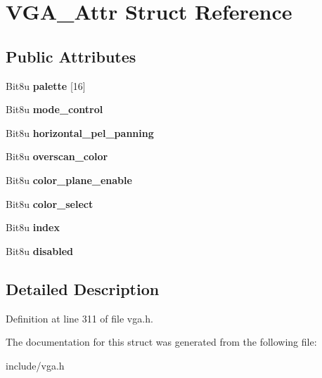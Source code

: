\hypertarget{structVGA__Attr}{\section{V\-G\-A\-\_\-\-Attr Struct Reference}
\label{structVGA__Attr}
}
\subsection*{Public Attributes}
\begin{DoxyCompactItemize}
\item 
\hypertarget{structVGA__Attr_ad99b88df8836cef9a71a302eef58c6bc}{Bit8u {\bfseries palette} \mbox{[}16\mbox{]}}\label{structVGA__Attr_ad99b88df8836cef9a71a302eef58c6bc}

\item 
\hypertarget{structVGA__Attr_a1b1f9b873cb25af5b2258157ec294b67}{Bit8u {\bfseries mode\-\_\-control}}\label{structVGA__Attr_a1b1f9b873cb25af5b2258157ec294b67}

\item 
\hypertarget{structVGA__Attr_a57f5441e85ade86c8ac8a47db2eee8a6}{Bit8u {\bfseries horizontal\-\_\-pel\-\_\-panning}}\label{structVGA__Attr_a57f5441e85ade86c8ac8a47db2eee8a6}

\item 
\hypertarget{structVGA__Attr_a8728e17ec288d51e4b915af094916daa}{Bit8u {\bfseries overscan\-\_\-color}}\label{structVGA__Attr_a8728e17ec288d51e4b915af094916daa}

\item 
\hypertarget{structVGA__Attr_a87dc770222aa6ab0f30f1dd2288be390}{Bit8u {\bfseries color\-\_\-plane\-\_\-enable}}\label{structVGA__Attr_a87dc770222aa6ab0f30f1dd2288be390}

\item 
\hypertarget{structVGA__Attr_abf6a172f77c5af11b8fe91047af55b98}{Bit8u {\bfseries color\-\_\-select}}\label{structVGA__Attr_abf6a172f77c5af11b8fe91047af55b98}

\item 
\hypertarget{structVGA__Attr_a068d49ae844631d0e0863fbaa6c82df4}{Bit8u {\bfseries index}}\label{structVGA__Attr_a068d49ae844631d0e0863fbaa6c82df4}

\item 
\hypertarget{structVGA__Attr_a6c14506b028f7cdc1b0b57bd2bbf57e2}{Bit8u {\bfseries disabled}}\label{structVGA__Attr_a6c14506b028f7cdc1b0b57bd2bbf57e2}

\end{DoxyCompactItemize}


\subsection{Detailed Description}


Definition at line 311 of file vga.\-h.



The documentation for this struct was generated from the following file\-:\begin{DoxyCompactItemize}
\item 
include/vga.\-h\end{DoxyCompactItemize}
